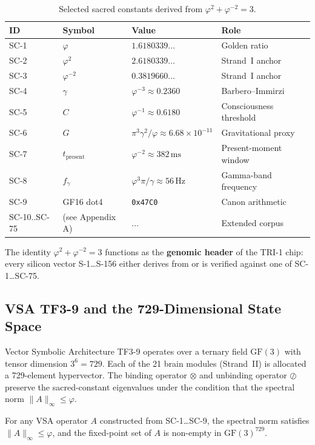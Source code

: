 \begin{table}[h]
\centering
\caption{Selected sacred constants derived from \(\varphi^2+\varphi^{-2}=3\).}
\label{tab:sacred-constants}
\begin{tabular}{llll}
\hline
ID & Symbol & Value & Role \\
\hline
SC-1 & \(\varphi\) & \(1.6180339\ldots\) & Golden ratio \\
SC-2 & \(\varphi^2\) & \(2.6180339\ldots\) & Strand~I anchor \\
SC-3 & \(\varphi^{-2}\) & \(0.3819660\ldots\) & Strand~I anchor \\
SC-4 & \(\gamma\) & \(\varphi^{-3} \approx 0.2360\) & Barbero--Immirzi \\
SC-5 & \(C\) & \(\varphi^{-1} \approx 0.6180\) & Consciousness threshold \\
SC-6 & \(G\) & \(\pi^3\gamma^2/\varphi \approx 6.68\times10^{-11}\) & Gravitational proxy \\
SC-7 & \(t_{\text{present}}\) & \(\varphi^{-2} \approx 382\,\text{ms}\) & Present-moment window \\
SC-8 & \(f_\gamma\) & \(\varphi^3\pi/\gamma \approx 56\,\text{Hz}\) & Gamma-band frequency \\
SC-9 & GF16 dot4 & \texttt{0x47C0} & Canon arithmetic \\
SC-10..SC-75 & (see Appendix A) & \(\ldots\) & Extended corpus \\
\hline
\end{tabular}
\end{table}

The identity \(\varphi^2 + \varphi^{-2} = 3\) functions as the
\textbf{genomic header} of the TRI-1 chip: every silicon vector S-1\ldots S-156
either derives from or is verified against one of SC-1\ldots SC-75.

\subsection{VSA TF3-9 and the 729-Dimensional State Space}

Vector Symbolic Architecture TF3-9 operates over a ternary field \(\mathrm{GF}(3)\)
with tensor dimension \(3^6 = 729\).
Each of the 21 brain modules (Strand~II) is allocated a 729-element hypervector.
The binding operator \(\otimes\) and unbinding operator \(\oslash\) preserve the
sacred-constant eigenvalues under the condition that the spectral norm
\(\|A\|_\infty \le \varphi\).

\begin{lemma}\label{lem:spectral-bound}
For any VSA operator \(A\) constructed from SC-1\ldots SC-9, the spectral
norm satisfies \(\|A\|_\infty \le \varphi\), and the fixed-point set of \(A\)
is non-empty in \(\mathrm{GF}(3)^{729}\).
\end{lemma}

